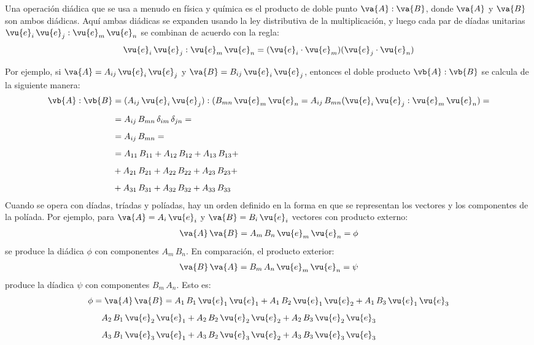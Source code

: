 Una operación diádica que se usa a menudo en física y química es el producto de doble punto $\va{A} : \va{B}$, donde $\va{A}$ y $\va{B}$ son ambos diádicas. Aquí ambas diádicas se expanden usando la ley distributiva de la multiplicación, y luego cada par de díadas unitarias $\vu{e}_{i} \, \vu{e}_{j} : \vu{e}_{m} \, \vu{e}_{n}$ se combinan de acuerdo con la regla:
\begin{align*}
\vu{e}_{i} \, \vu{e}_{j} : \vu{e}_{m} \, \vu{e}_{n} = (\vu{e}_{i} \cdot \vu{e}_{m}) (\vu{e}_{j} \cdot \vu{e}_{n})
\end{align*}

Por ejemplo, si $\va{A} = A_{ij} \, \vu{e}_{i} \, \vu{e}_{j}$ y $\va{B} = B_{ij} \, \vu{e}_{i} \, \vu{e}_{j}$, entonces el doble producto $\vb{A} : \vb{B}$ se calcula de la siguiente manera:
\begin{align*}
\vb{A} : \vb{B} &= (A_{ij} \, \vu{e}_{i} \, \vu{e}_{j}) : (B_{mn} \, \vu{e}_{m} \, \vu{e}_{n} = A_{ij} \, B_{mn} ( \vu{e}_{i} \, \vu{e}_{j} : \vu{e}_{m} \, \vu{e}_{n}) = \\[0.5em]
&= A_{ij} \, B_{mn} \, \delta_{im} \, \delta_{jn} = \\[0.5em]
&= A_{ij} \, B_{mn} = \\[0.5em]
&= A_{11} \, B_{11} + A_{12} \, B_{12} + A_{13} \, B_{13} + \\[0.5em] 
&+ A_{21} \, B_{21} + A_{22} \, B_{22} + A_{23} \, B_{23} + \\[0.5em] 
&+ A_{31} \, B_{31} + A_{32} \, B_{32} + A_{33} \, B_{33} 
\end{align*}
Cuando se opera con díadas, tríadas y políadas, hay un orden definido en la forma en que se representan los vectores y los componentes de la políada. Por ejemplo, para $\va{A} = A_{i} \, \vu{e}_{i}$ y $\va{B} = B_{i} \, \vu{e}_{i}$ vectores con producto externo:
\begin{align*}
\va{A} \, \va{B} = A_{m} \, B_{n} \, \vu{e}_{m} \, \vu{e}_{n} = \phi
\end{align*}
se produce la diádica $\phi$ con componentes $A_{m} \, B_{n}$. En comparación, el producto exterior:
\begin{align*}
\va{B} \, \va{A} = B_{m} \, A_{n} \, \vu{e}_{m} \, \vu{e}_{n} = \psi
\end{align*}
produce la díadica $\psi$ con componentes $B_{m} \, A_{n}$. Esto es:
\begin{align*}
\phi &= \va{A} \, \va{B} =  A_{1} \, B_{1} \, \vu{e}_{1} \, \vu{e}_{1} + A_{1} \, B_{2} \, \vu{e}_{1} \, \vu{e}_{2} + A_{1} \, B_{3} \, \vu{e}_{1} \, \vu{e}_{3} \\[0.5em]
&{\quad} A_{2} \, B_{1} \, \vu{e}_{2} \, \vu{e}_{1} + A_{2} \, B_{2} \, \vu{e}_{2} \, \vu{e}_{2} + A_{2} \, B_{3} \, \vu{e}_{2} \, \vu{e}_{3} \\[0.5em]
&{\quad} A_{3} \, B_{1} \, \vu{e}_{3} \, \vu{e}_{1} + A_{3} \, B_{2} \, \vu{e}_{3} \, \vu{e}_{2} + A_{3} \, B_{3} \, \vu{e}_{3} \, \vu{e}_{3}
\end{align*}
